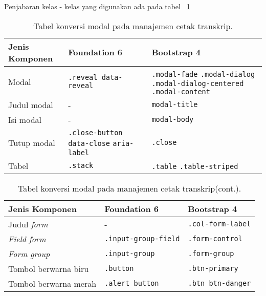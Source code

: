 \noindent Penjabaran kelas - kelas yang digunakan ada pada tabel ~\ref{table:konversiModalManajemenCetakTranskrip}
\begin{table}[H]
	\caption{Tabel konversi modal pada manajemen cetak transkrip.}
	\begin{tabular}{| p{} | p{} | p{} |} 
		\hline
		\textbf{Jenis Komponen} & \textbf{Foundation 6} & \textbf{Bootstrap 4}  \\ [0.5ex] 
		\hline	
		Modal & \texttt{.reveal data-reveal} & \texttt{.modal-fade} \newline \texttt{.modal-dialog} \newline \texttt{.modal-dialog-centered} \newline \texttt{.modal-content} \\
		\hline
		Judul modal & - & \texttt{modal-title}\\
		\hline
		Isi modal & - & \texttt{modal-body}\\
		\hline
		Tutup modal & \texttt{.close-button} \newline \texttt{data-close} \newline \texttt{aria-label} & \texttt{.close}\\
		\hline	
		Tabel & \texttt{.stack} & \texttt{.table} \newline \texttt{.table-striped} \\	[1ex]
		\hline 		
	\end{tabular}
\end{table}

\begin{table}[H] \ContinuedFloat
	\caption{Tabel konversi modal pada manajemen cetak transkrip(cont.).}
	\begin{tabular}{| p{} | p{} | p{} |} 
		\hline
		\textbf{Jenis Komponen} & \textbf{Foundation 6} & \textbf{Bootstrap 4}  \\ [0.5ex] 
		\hline	
		Judul \textit{form} & - & \texttt{.col-form-label}\\
		\hline
		\textit{Field form} & \texttt{.input-group-field} & \texttt{.form-control}\\
		\hline
		\textit{Form group} & \texttt{.input-group} & \texttt{.form-group}\\
		\hline
		Tombol berwarna biru & \texttt{.button} & \texttt{.btn-primary}  \\
		\hline
		Tombol berwarna merah & \texttt{.alert button} & \texttt{.btn btn-danger} \\[1ex]
		\hline
	\end{tabular}
	\label{table:konversiModalManajemenCetakTranskrip}
\end{table}

